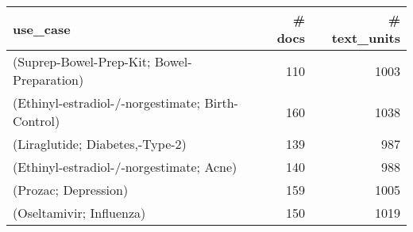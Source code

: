 \begin{tabular}{lrr}
\toprule
                                         use\_case &  \# docs &  \# text\_units \\
\midrule
       (Suprep-Bowel-Prep-Kit; Bowel-Preparation) &     110 &          1003 \\
(Ethinyl-estradiol-/-norgestimate; Birth-Control) &     160 &          1038 \\
                  (Liraglutide; Diabetes,-Type-2) &     139 &           987 \\
         (Ethinyl-estradiol-/-norgestimate; Acne) &     140 &           988 \\
                             (Prozac; Depression) &     159 &          1005 \\
                         (Oseltamivir; Influenza) &     150 &          1019 \\
\bottomrule
\end{tabular}

